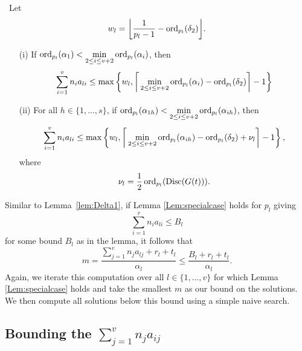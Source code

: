 \begin{lemma} \label{Lem:specialcase} \
Let
\[w_l = \bigg\lfloor{\frac{1}{p_l-1} - \operatorname{ord}_{p_l}(\delta_2)}\bigg\rfloor.\]
\begin{enumerate}
\item[(i)] If $\operatorname{ord}_{p_l}(\alpha_1) < \displaystyle \min_{2 \leq i \leq v+2} \operatorname{ord}_{p_l}(\alpha_i)$, then
\[\sum_{i = 1}^v n_i a_{li} \leq \max \left\{w_l, \bigg \lceil\displaystyle \min_{2 \leq i \leq v+2} \operatorname{ord}_{p_l}(\alpha_{i}) - \operatorname{ord}_{p_l}(\delta_2) \bigg \rceil - 1 \right\}\]

\item[(ii)] For all $h \in \{1, \dots, s\}$, if $\operatorname{ord}_{p_l}(\alpha_{1h}) < \displaystyle \min_{2 \leq i \leq v+2} \operatorname{ord}_{p_l}(\alpha_{ih})$, then
\[\sum_{i = 1}^v n_i a_{li} \leq \max \left\{ w_l, \bigg \lceil \displaystyle \min_{2 \leq i \leq v+2} \operatorname{ord}_{p_l}(\alpha_{ih})- \operatorname{ord}_{p_l}(\delta_2) + \nu_l \bigg \rceil - 1\right\},\]
where 
\[\nu_l = \frac{1}{2}\operatorname{ord}_{p_l}(\text{Disc}(G(t))).\]
\end{enumerate}
\end{lemma}

Similar to Lemma~\ref{lem:Delta1}, if Lemma \ref{Lem:specialcase} holds for $p_l$ giving
\[\sum_{i = 1}^v n_i a_{li} \leq B_l\]
for some bound $B_l$ as in the lemma, it follows that
\[m = \frac{\sum_{j = 1}^{v}n_ja_{lj} + r_l + t_l}{\alpha_l} \leq \frac{B_l + r_l + t_l}{\alpha_l}. \]
Again, we iterate this computation over all $l \in \{1, \dots, v \}$ for which Lemma \ref{Lem:specialcase} holds and take the smallest $m$ as our bound on the solutions. We then compute all solutions below this bound using a simple naive search. 


\subsection{Bounding the $\sum_{j = 1}^v n_ja_{ij}$}

